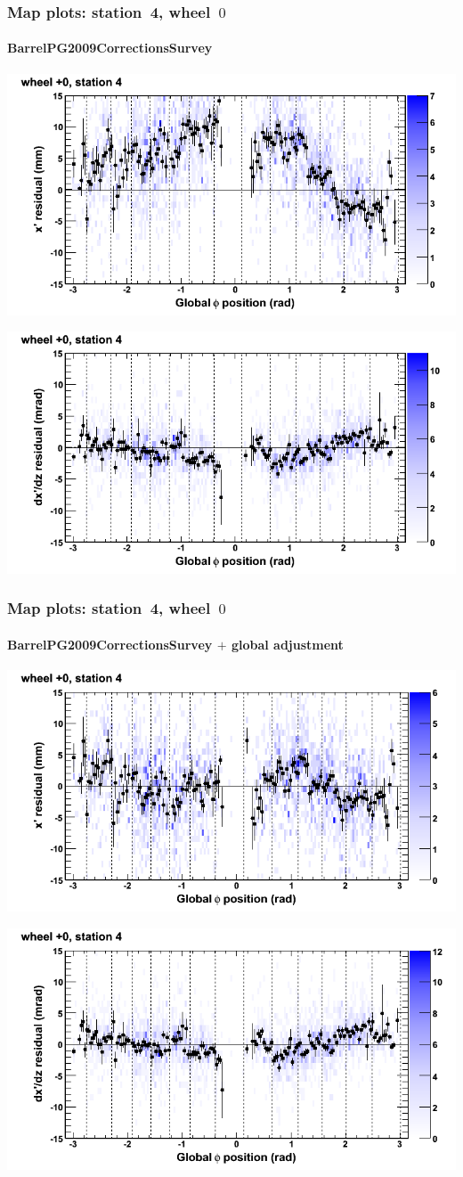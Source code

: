 \documentclass[compress]{beamer}
\begin{document}
\begin{frame}
\frametitle{Map plots: station~4, wheel~$0$}
\framesubtitle{BarrelPG2009CorrectionsSurvey}
\includegraphics[width=0.5\linewidth]{mapplots_01/DTvsphi_st4whC_x.png}

\includegraphics[width=0.5\linewidth]{mapplots_01/DTvsphi_st4whC_dxdz.png}
\end{frame}
\begin{frame}
\frametitle{Map plots: station~4, wheel~$0$}
\framesubtitle{BarrelPG2009CorrectionsSurvey $+$ global adjustment}
\includegraphics[width=0.5\linewidth]{mapplots_re01/DTvsphi_st4whC_x.png}

\includegraphics[width=0.5\linewidth]{mapplots_re01/DTvsphi_st4whC_dxdz.png}
\end{frame}
\end{document}
